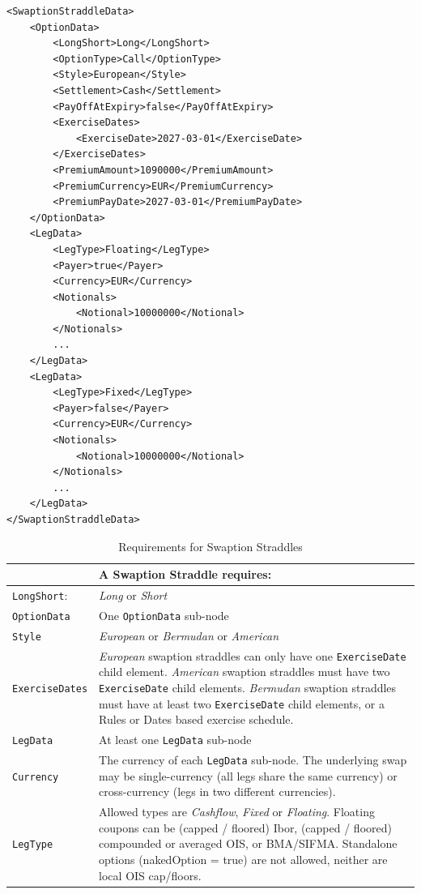 \begin{listing}[H]
\begin{verbatim}
<SwaptionStraddleData>
    <OptionData>
        <LongShort>Long</LongShort>
        <OptionType>Call</OptionType>
        <Style>European</Style>
        <Settlement>Cash</Settlement>
        <PayOffAtExpiry>false</PayOffAtExpiry>
        <ExerciseDates>
            <ExerciseDate>2027-03-01</ExerciseDate>
        </ExerciseDates>
        <PremiumAmount>1090000</PremiumAmount>
        <PremiumCurrency>EUR</PremiumCurrency>
        <PremiumPayDate>2027-03-01</PremiumPayDate>
    </OptionData>
    <LegData>
        <LegType>Floating</LegType>
        <Payer>true</Payer>
        <Currency>EUR</Currency>
        <Notionals>
            <Notional>10000000</Notional>
        </Notionals>
        ...
    </LegData>
    <LegData>
        <LegType>Fixed</LegType>
        <Payer>false</Payer>
        <Currency>EUR</Currency>
        <Notionals>
            <Notional>10000000</Notional>
        </Notionals>
        ...
    </LegData>
</SwaptionStraddleData>
\end{verbatim}
\caption{Swaption Straddle data}
\label{lst:swaption_straddle_data}
\end{listing}

\begin{table}[H]
\centering
\begin{tabular} {|l|p{10cm}|}
    \hline
        & \bfseries{A Swaption Straddle requires:} \\  \hline
    \lstinline!LongShort!: & \emph{Long} or \emph{Short} \\ \hline
    \lstinline!OptionData! & One \lstinline!OptionData! sub-node  \\  \hline
    \lstinline!Style! &  \emph{European} or \emph{Bermudan} or \emph{American} \\ \hline
    \lstinline!ExerciseDates! & \emph{European} swaption straddles can only have one \lstinline!ExerciseDate! child element. \emph{American} swaption straddles must have two \lstinline!ExerciseDate! child elements. \emph{Bermudan} swaption straddles must have at least two \lstinline!ExerciseDate! child elements, or a Rules or Dates based exercise schedule. \\ \hline
    \lstinline!LegData! &  At least one \lstinline!LegData! sub-node \\ \hline
    \lstinline!Currency! & The currency of each \lstinline!LegData! sub-node. The underlying swap may be single-currency (all legs share the same currency) or cross-currency (legs in two different currencies).\\ \hline
    \lstinline!LegType! & Allowed types are \emph{Cashflow}, \emph{Fixed} or \emph{Floating}. Floating coupons can be (capped / floored) Ibor, (capped / floored) compounded or averaged OIS, or BMA/SIFMA. Standalone options (nakedOption = true) are not allowed, neither are local OIS cap/floors. \\ \hline
  \end{tabular}
  \caption{Requirements for Swaption Straddles}
  \label{tab:swaption_straddle_requirements}
\end{table}

